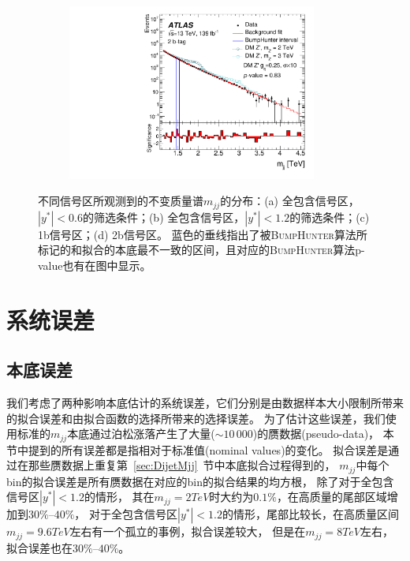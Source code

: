 \begin{figure}[htbp]
\begin{subfigure}{.5\textwidth}
  \caption{}
  \end{subfigure}
  \begin{subfigure}{.5\textwidth}
  \centering
  \includegraphics[width=0.9\textwidth]{figs/fig_03d.pdf}
  \caption{}
  \end{subfigure}
  \caption{
 不同信号区所观测到的不变质量谱$m_{jj}$的分布：(a) 全包含信号区，$|y^*|<0.6$的筛选条件；(b) 全包含信号区，$|y^*|<1.2$的筛选条件；(c) 1b信号区；(d) 2b信号区。
 蓝色的垂线指出了被\textsc{BumpHunter}算法所标记的和拟合的本底最不一致的区间，且对应的\textsc{BumpHunter}算法p-value也有在图中显示。  }
  \label{fig:dijetspectra}
\end{figure} 



\section{系统误差} 
\label{sec:DijetSys}


\subsection{本底误差} 
\label{sec:DijetSysBkg}

我们考虑了两种影响本底估计的系统误差，它们分别是由数据样本大小限制所带来的拟合误差和由拟合函数的选择所带来的选择误差。
为了估计这些误差，我们使用标准的$m_{jj}$本底通过泊松涨落产生了大量($\sim 10\,000$)的赝数据(pseudo-data)，
本节中提到的所有误差都是指相对于标准值(nominal values)的变化。
拟合误差是通过在那些赝数据上重复第~\ref{sec:DijetMjj}~节中本底拟合过程得到的，
$m_{jj}$中每个bin的拟合误差是所有赝数据在对应的bin的拟合结果的均方根，
除了对于全包含信号区$|y^*|<1.2$的情形，
其在$m_{jj}=2TeV$时大约为$0.1\%$，在高质量的尾部区域增加到$30\%\text{--}40\%$，
对于全包含信号区$|y^*|<1.2$的情形，尾部比较长，在高质量区间$m_{jj}=9.6TeV$左右有一个孤立的事例，拟合误差较大，
但是在$m_{jj}=8TeV$左右，拟合误差也在$30\%\text{--}40\%$。



